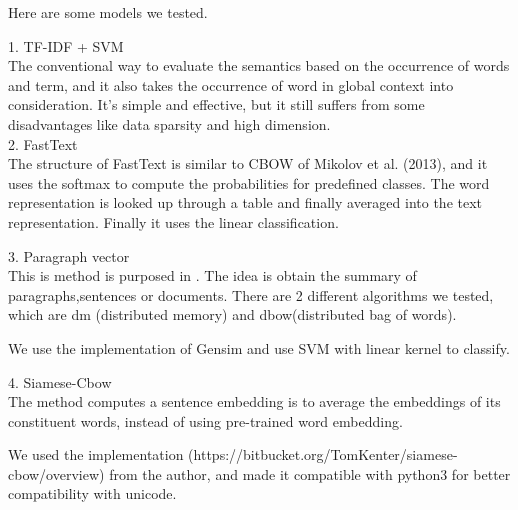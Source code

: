 Here are some models we tested.

1. TF-IDF + SVM \\

	The conventional way to evaluate the semantics based on the occurrence of words and term, and it also takes the occurrence of word in global context into consideration.  It's simple and effective, but it still suffers from some disadvantages like data sparsity and high dimension. \\
	
2. FastText \cite{joulin2016fasttext}\\
	
	The structure of FastText is similar to CBOW of Mikolov et al. (2013), and it uses the softmax to compute the probabilities for predefined classes. The word representation is looked up through a table and finally averaged into the text representation. Finally it uses the linear classification.

3. Paragraph vector \cite{PVDB}\\

	This is method is purposed in \cite{PVDB}. The idea is obtain the summary of paragraphs,sentences or documents. There are 2 different algorithms we tested, which are dm (distributed memory) and dbow(distributed bag of words).

We use the implementation of Gensim and use SVM with linear kernel to classify.

4. Siamese-Cbow\cite{kenter2016siamesecbow}\\

	The method computes a sentence embedding is to average the embeddings of its
constituent words, instead of using pre-trained word embedding.

	We used the implementation (https://bitbucket.org/TomKenter/siamese-cbow/overview) from the author, and made it compatible with python3 for better compatibility with unicode.
